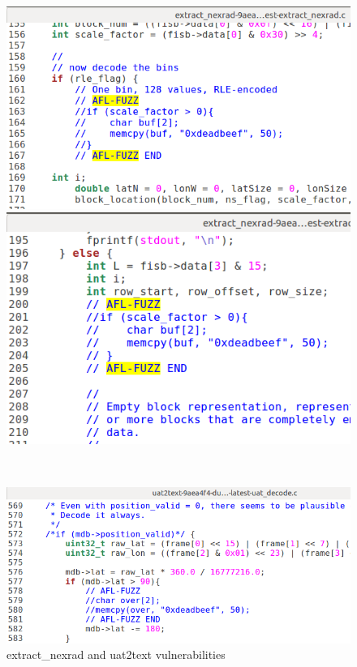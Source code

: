 \documentclass[../main.tex]{subfiles}
\begin{document}
\begin{figure}[htp]
\centering
\begin{minipage}{.5\textwidth}
  \centering
  \includegraphics[scale=0.4]{images/src_extract_nexrad-9aea4f4-dump978-latest-vuln0.png}
\end{minipage}%
\begin{minipage}{.5\textwidth}
  \centering
  \vspace*{-0.033in}
  \includegraphics[scale=0.4]{images/src_extract_nexrad-9aea4f4-dump978-latest-vuln1.png}
  \end{minipage}\\
  \begin{minipage}{.5\textwidth}
    \hspace*{-0.3in}
    \includegraphics[scale=0.45]{images/src_uat2text-9aea4f4-dump978-latest-vuln0.png}
    \end{minipage}
\caption{extract\_nexrad and uat2text vulnerabilities}
\label{fig:978vuln}
\end{figure}
\end{document}
